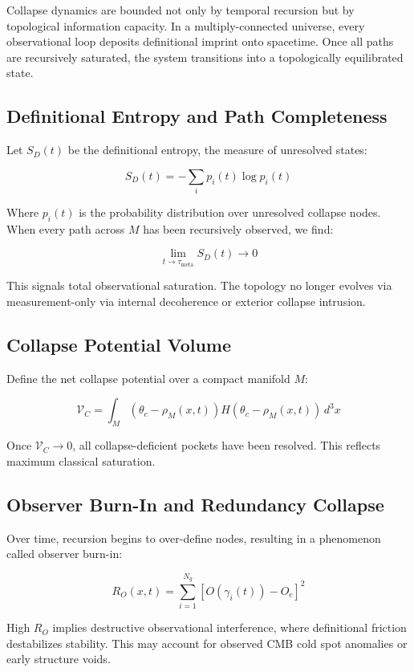 Collapse dynamics are bounded not only by temporal recursion but by topological information capacity. In a multiply-connected universe, every observational loop deposits definitional imprint onto spacetime. Once all paths are recursively saturated, the system transitions into a topologically equilibrated state\cite{planck2018results}.

\subsection{Definitional Entropy and Path Completeness}

Let \( S_D(t) \) be the definitional entropy, the measure of unresolved states:

\[
S_D(t) = - \sum_i p_i(t) \log p_i(t)
\]

Where \( p_i(t) \) is the probability distribution over unresolved collapse nodes. When every path across \( M \) has been recursively observed, we find:

\[
\lim_{t \to \tau_{\text{meta}}} S_D(t) \to 0
\]

This signals total observational saturation. The topology no longer evolves via measurement-only via internal decoherence or exterior collapse intrusion.

\subsection{Collapse Potential Volume}

Define the net collapse potential over a compact manifold \( M \):

\[
\mathcal{V}_C = \int_M \left( \theta_c - \rho_M(x,t) \right) H(\theta_c - \rho_M(x,t)) \, d^3x
\]

Once \( \mathcal{V}_C \to 0 \), all collapse-deficient pockets have been resolved. This reflects maximum classical saturation.

\subsection{Observer Burn-In and Redundancy Collapse}

Over time, recursion begins to over-define nodes, resulting in a phenomenon called observer burn-in:

\[
R_O(x,t) = \sum_{i=1}^{N_g} \left[ O(\gamma_i(t)) - O_c \right]^2
\]

High \( R_O \) implies destructive observational interference, where definitional friction destabilizes stability. This may account for observed CMB cold spot anomalies or early structure voids.

